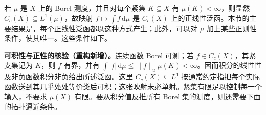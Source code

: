 \documentclass[../../main.tex]{subfiles}
\begin{document}
若 $\mu$ 是 $X$ 上的 Borel 测度，并且对每个紧集 $K\subseteq X$ 有 $\mu(K)<\infty$，则显然 $C_c(X)\subseteq L^1(\mu)$，故映射 $f\mapsto\int f\,\mathrm d\mu$ 是 $C_c(X)$ 上的正线性泛函。本节的主要结果是，每个正线性泛函都以这种方式产生；此外，可以对 $\mu$ 加上某些正则性条件，使其唯一。这些条件如下。
\begin{remark}
\textbf{可积性与正性的核验（重构新增）。}连续函数 Borel 可测；若 $f\in C_c(X)$，其紧支集记为 $K$，则 $f$ 有界，并有 $\int|f|\,\mathrm d\mu\leqslant\|f\|_u\mu(K)<\infty$。因而积分的线性性及非负函数积分非负给出所述泛函。这里 $C_c(X)\subseteq L^1$ 按通常约定指把每个实际函数送到其几乎处处等价类后可积；这张映射未必单射。紧集有限足以控制每一个输入，不要求 $\mu(X)$ 有限。要从积分值反推所有 Borel 集的测度，则还需要下面的拓扑逼近条件。
\end{remark}
\end{document}
